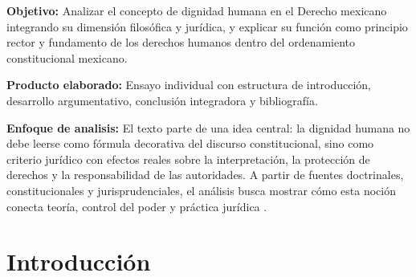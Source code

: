 \documentclass[
	spanish,
	letterpaper, oneside
]{article}
\begin{document}
\templatePortrait

\templatePagecfg
\onehalfspacing

\begin{abstractd}
	\textbf{Objetivo:} Analizar el concepto de dignidad humana en el Derecho mexicano integrando su dimensión filosófica y jurídica, y explicar su función como principio rector y fundamento de los derechos humanos dentro del ordenamiento constitucional mexicano.

	\textbf{Producto elaborado:} Ensayo individual con estructura de introducción, desarrollo argumentativo, conclusión integradora y bibliografía.

	\textbf{Enfoque de analisis:} El texto parte de una idea central: la dignidad humana no debe leerse como fórmula decorativa del discurso constitucional, sino como criterio jurídico con efectos reales sobre la interpretación, la protección de derechos y la responsabilidad de las autoridades. A partir de fuentes doctrinales, constitucionales y jurisprudenciales, el análisis busca mostrar cómo esta noción conecta teoría, control del poder y práctica jurídica \citep{constitucionCPEUM2026,scjnJur37_2016,ronquilloarmasEticaGeneralProfesional2018}.
\end{abstractd}

\templateIndex

\templateFinalcfg


%
\section{Introducción}
\end{document}

